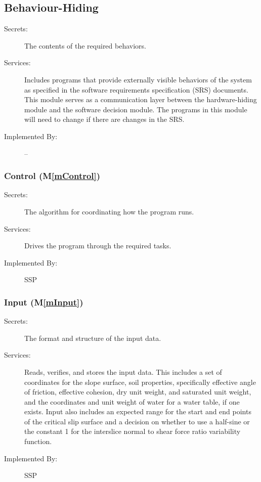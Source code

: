 \documentclass[12pt, titlepage]{article}
\newcommand{\progname}{SSP}
\newcommand{\mref}[1]{M\ref{#1}}
\begin{document}
\subsection{Behaviour-Hiding}

\begin{description}
\item[Secrets:]The contents of the required behaviors.
\item[Services:]Includes programs that provide externally visible
  behaviors of the system as specified in the software requirements
  specification (SRS) documents. This module serves as a communication
  layer between the hardware-hiding module and the software decision
  module. The programs in this module will need to change if there are
  changes in the SRS.
\item[Implemented By:] --
\end{description}

\subsubsection{Control (\mref{mControl})}

\begin{description}
\item[Secrets:] The algorithm for coordinating how the program runs.
\item[Services:] Drives the program through the required tasks.
\item[Implemented By:] \progname
\end{description}


\subsubsection{Input (\mref{mInput})}

\begin{description}
\item[Secrets:]The format and structure of the input data.
\item[Services:] Reads, verifies, and stores the input data. This includes a 
  set of coordinates for the slope surface, soil properties, 
  specifically effective angle of friction, effective cohesion, dry unit 
  weight, and saturated unit weight, and the coordinates and unit weight of 
  water for a water table, if one exists. Input also includes an expected range 
  for the start and end points of the critical slip surface and a decision on 
  whether to use a half-sine or the constant 1 for the interslice normal to 
  shear force ratio variability function.
\item[Implemented By:] \progname
\end{description}
\end{document}
